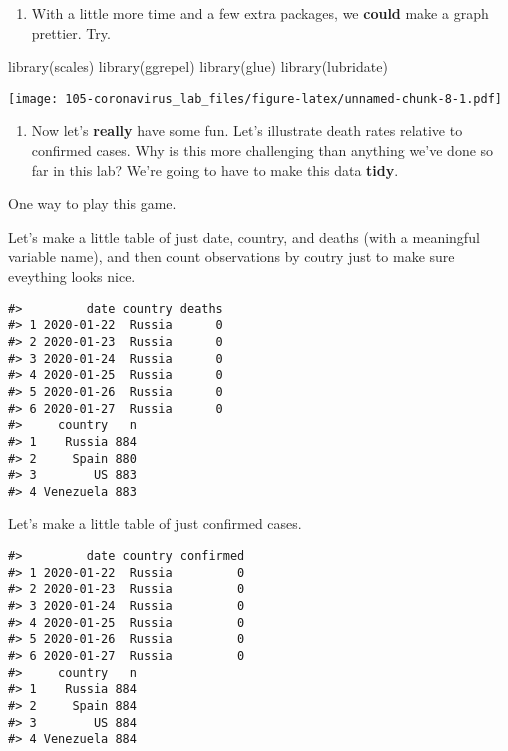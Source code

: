 \documentclass[
]{book}
\newenvironment{Shaded}{\begin{snugshade}}{\end{snugshade}}
\newcommand{\FunctionTok}[1]{\textcolor[rgb]{0.00,0.00,0.00}{#1}}
\newcommand{\NormalTok}[1]{#1}
\providecommand{\tightlist}{%
  \setlength{\itemsep}{0pt}\setlength{\parskip}{0pt}}
\begin{document}
\begin{enumerate}
\def\labelenumi{\arabic{enumi}.}
\setcounter{enumi}{5}
\tightlist
\item
  With a little more time and a few extra packages, we \textbf{could} make a graph prettier. Try.
\end{enumerate}

\begin{Shaded}
\begin{Highlighting}[]
\FunctionTok{library}\NormalTok{(scales)}
\FunctionTok{library}\NormalTok{(ggrepel)}
\FunctionTok{library}\NormalTok{(glue)}
\FunctionTok{library}\NormalTok{(lubridate)}
\end{Highlighting}
\end{Shaded}

\texttt{[image: 105-coronavirus\_lab\_files/figure-latex/unnamed-chunk-8-1.pdf]}

\begin{enumerate}
\def\labelenumi{\arabic{enumi}.}
\setcounter{enumi}{6}
\tightlist
\item
  Now let's \textbf{really} have some fun. Let's illustrate death rates relative to confirmed cases. Why is this more challenging than anything we've done so far in this lab? We're going to have to make this data \textbf{tidy}.
\end{enumerate}

One way to play this game.

Let's make a little table of just date, country, and deaths (with a meaningful variable name), and then count observations by coutry just to make sure eveything looks nice.

\begin{verbatim}
#>         date country deaths
#> 1 2020-01-22  Russia      0
#> 2 2020-01-23  Russia      0
#> 3 2020-01-24  Russia      0
#> 4 2020-01-25  Russia      0
#> 5 2020-01-26  Russia      0
#> 6 2020-01-27  Russia      0
#>     country   n
#> 1    Russia 884
#> 2     Spain 880
#> 3        US 883
#> 4 Venezuela 883
\end{verbatim}

Let's make a little table of just confirmed cases.

\begin{verbatim}
#>         date country confirmed
#> 1 2020-01-22  Russia         0
#> 2 2020-01-23  Russia         0
#> 3 2020-01-24  Russia         0
#> 4 2020-01-25  Russia         0
#> 5 2020-01-26  Russia         0
#> 6 2020-01-27  Russia         0
#>     country   n
#> 1    Russia 884
#> 2     Spain 884
#> 3        US 884
#> 4 Venezuela 884
\end{verbatim}
\end{document}
